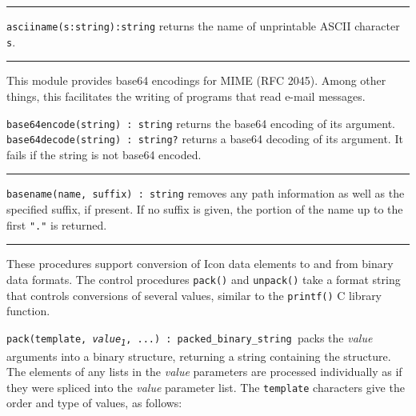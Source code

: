 \vspace{0.25cm}\hrule{}

\texttt{asciiname(s:string):string} returns the name of
unprintable ASCII character \texttt{s}.

\pagebreak

\vspace{0.25cm}\hrule{}

This module provides base64 encodings for MIME (RFC 2045).
Among other things, this facilitates the writing of programs that read
e-mail messages.

\texttt{base64encode(string) : string} returns the base64 encoding of
its argument.\\
\texttt{base64decode(string) : string?} returns a base64 decoding of its
argument. It fails if the string is not base64 encoded.

\vspace{0.25cm}\hrule{}

\texttt{basename}\texttt{(name, suffix) : string} removes
any path information as well as the specified suffix, if present.
If no suffix is given, the portion of the name up to the first
\texttt{"."} is returned.

\vspace{0.25cm}\hrule{}

These procedures support conversion of Icon data elements
to and from binary data formats. The control procedures \texttt{pack()}
and \texttt{unpack()} take a format string that controls conversions of
several values, similar to the \texttt{printf()} C library function.

\texttt{pack(template,
}\texttt{\textit{value}}\texttt{\textit{\textsubscript{1}}}\texttt{,
...) : packed\_binary\_string}\texttt{ }packs the \textit{value}
arguments into a binary structure, returning a string containing the
structure. The elements of any lists in the \textit{value} parameters
are processed individually as if they were spliced into the
\textit{value} parameter list. The \texttt{template} characters give
the order and type of values, as follows:

